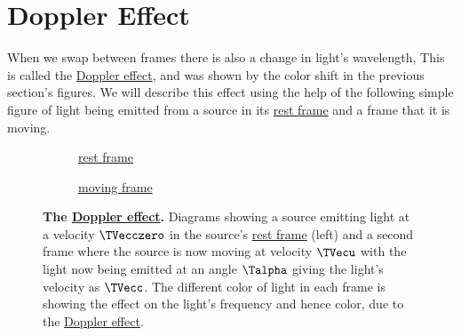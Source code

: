 \section{Doppler Effect} \label{sect: Doppler Effect}

When we swap between frames there is also a change in light's wavelength, This is called the \hyperlink{def-doppler-effect}{Doppler effect}, and was shown by the color shift in the previous section's figures.
We will describe this effect using the help of the following simple figure of light being emitted from a source in its \hyperlink{def-proper-frame}{rest frame} and a frame that it is moving.

\begin{figure}[H]
	\begin{subfigure}{.49\textwidth}
    \centering
    \caption{\protect\hyperlink{def-proper-frame}{rest frame}}
\end{subfigure}
\begin{subfigure}{.49\textwidth}
    \centering
    \caption{\protect\hyperlink{def-Moving-Frame}{moving frame}}
\end{subfigure}
	\caption{\textbf{The \protect\hyperlink{def-doppler-effect}{Doppler effect}.} Diagrams showing a source emitting light at a velocity $\TVecczero $ in the source's \protect\hyperlink{def-proper-frame}{rest frame} (left) and a second frame where the source is now moving at velocity $\TVecu $ with the light now being emitted at an angle ${\Talpha }$ giving the light's velocity as ${\TVecc  }$. The different color of light in each frame is showing the effect on the light's frequency and hence color, due to the \protect\hyperlink{def-doppler-effect}{Doppler effect}.}
	\label{fig: Doppler effect}
\end{figure}

